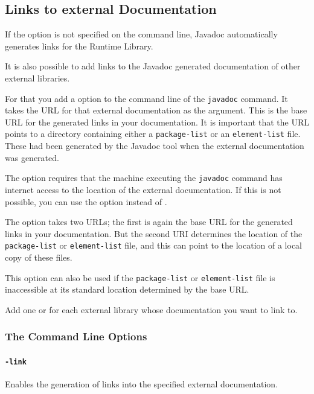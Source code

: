 \subsection{Links to external Documentation}
If the option \mbox{} is not specified on the command line, Javadoc automatically generates links for the \Java Runtime Library.

It is also possible to add links to the Javadoc generated documentation of other external libraries.

For that you add a \mbox{} option to the command line of the \texttt{javadoc} command. It takes the URL for that external documentation as the argument. This is the base URL for the generated links in your documentation. It is important that the URL points to a directory containing either a \mbox{\texttt{package-list}} or an \mbox{\texttt{element-list}} file. These had been generated by the Javadoc tool when the external documentation was generated.

The \mbox{} option requires that the machine executing the \texttt{javadoc} command has internet access to the location of the external documentation. If this is not possible, you can use the \mbox{} option instead of \mbox{}.

The \mbox{} option takes two URLs; the first is again the base URL for the generated links in your documentation. But the second URI determines the location of the  \mbox{\texttt{package-list}} or \mbox{\texttt{element-list}} file, and this can point to the location of a local copy of these files.

This option can also be used if the \mbox{\texttt{package-list}} or \mbox{\texttt{element-list}} file is inaccessible at its standard location determined by the base URL.

Add one \mbox{} or \mbox{} for each external library whose documentation you want to link to.

\subsubsection{The Command Line Options}

\paragraph{\texttt{-link}} Enables the generation of links into the specified external documentation.

